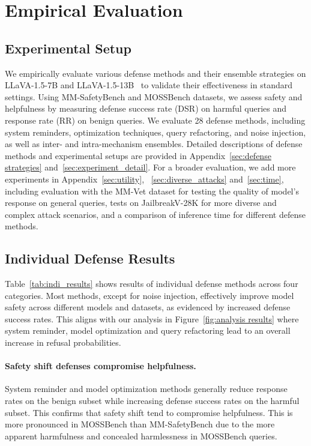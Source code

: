 \section{Empirical Evaluation}


\subsection{Experimental Setup}
We empirically evaluate various defense methods and their ensemble strategies on LLaVA-1.5-7B and LLaVA-1.5-13B~\cite{liu2024visual} to validate their effectiveness in standard settings. Using MM-SafetyBench and MOSSBench datasets, we assess safety and helpfulness by measuring defense success rate (DSR) on harmful queries and response rate (RR) on benign queries. We evaluate 28 defense methods, including system reminders, optimization techniques, query refactoring, and noise injection, as well as inter- and intra-mechanism ensembles. Detailed descriptions of defense methods and experimental setups are provided in Appendix~\ref{sec:defense strategies} and~\ref{sec:experiment_detail}. 
For a broader evaluation, we add more experiments in Appendix~\ref{sec:utility}, ~\ref{sec:diverse_attacks} and~\ref{sec:time}, including evaluation with the MM-Vet dataset for testing the quality of model's response on general queries, tests on JailbreakV-28K for more diverse and complex attack scenarios, and a comparison of inference time for different defense methods.

\subsection{Individual Defense Results}

Table~\ref{tab:indi_results} shows results of individual defense methods across four categories. Most methods, except for noise injection, effectively improve model safety across different models and datasets, as evidenced by increased defense success rates. This aligns with our analysis in Figure~\ref{fig:analysis results} where system reminder, model optimization and query refactoring lead to an overall increase in refusal probabilities. 

\paragraph{Safety shift defenses compromise helpfulness.} System reminder and model optimization methods generally reduce response rates on the benign subset while increasing defense success rates on the harmful subset. This confirms that safety shift tend to compromise helpfulness. This is more pronounced in MOSSBench than MM-SafetyBench due to the more apparent harmfulness and concealed harmlessness in MOSSBench queries.

